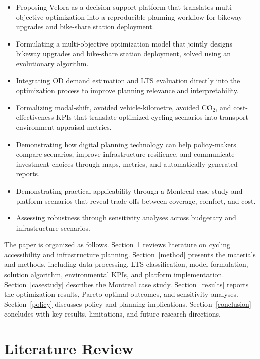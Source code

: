 \documentclass[preprint,authoryear,10pt]{elsarticle}
\begin{document}
\begin{itemize}
\item Proposing Velora as a decision-support platform that translates multi-objective optimization into a reproducible planning workflow for bikeway upgrades and bike-share station deployment.
\item Formulating a multi-objective optimization model that jointly designs bikeway upgrades and bike-share station deployment, solved using an evolutionary algorithm.
\item Integrating OD demand estimation and LTS evaluation directly into the optimization process to improve planning relevance and interpretability.
\item Formalizing modal-shift, avoided vehicle-kilometre, avoided CO$_2$, and cost-effectiveness KPIs that translate optimized cycling scenarios into transport-environment appraisal metrics.
\item Demonstrating how digital planning technology can help policy-makers compare scenarios, improve infrastructure resilience, and communicate investment choices through maps, metrics, and automatically generated reports.
\item Demonstrating practical applicability through a Montreal case study and platform scenarios that reveal trade-offs between coverage, comfort, and cost.
\item Assessing robustness through sensitivity analyses across budgetary and infrastructure scenarios.
\end{itemize}

The paper is organized as follows. Section~\ref{review} reviews literature on cycling accessibility and infrastructure planning. Section~\ref{method} presents the materials and methods, including data processing, LTS classification, model formulation, solution algorithm, environmental KPIs, and platform implementation. Section~\ref{casestudy} describes the Montreal case study. Section~\ref{results} reports the optimization results, Pareto-optimal outcomes, and sensitivity analyses. Section~\ref{policy} discusses policy and planning implications. Section~\ref{conclusion} concludes with key results, limitations, and future research directions.


\section{Literature Review}\label{review}
\end{document}
